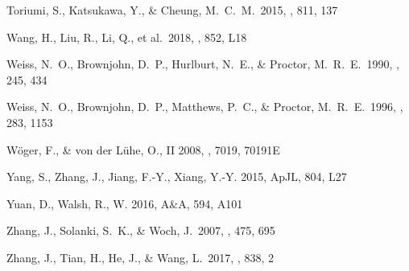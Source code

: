 \documentclass[preprint2]{aastex}
\begin{document}
\begin{thebibliography}{}
 Toriumi, S., Katsukawa, Y., \& Cheung, M.~C.~M.\ 2015, \apj, 811, 137

Wang, H., Liu, R., Li, Q., et al.\ 2018, \apjl, 852, L18

Weiss, N.~O., Brownjohn, D.~P., Hurlburt, N.~E., \& Proctor, M.~R.~E.\ 1990, \mnras, 245, 434

Weiss, N.~O., Brownjohn, D.~P., Matthews, P.~C., \& Proctor, M.~R.~E.\ 1996, \mnras, 283, 1153

W{\"o}ger, F., \& von der L{\"u}he, O., II 2008, \procspie, 7019, 70191E

Yang, S., Zhang, J., Jiang, F.-Y., Xiang, Y.-Y. 2015, ApJL, 804, L27

Yuan, D., Walsh, R., W. 2016, A\&A, 594, A101

Zhang, J., Solanki, S.~K., \& Woch, J.\ 2007, \aap, 475, 695

Zhang, J., Tian, H., He, J., \& Wang, L.\ 2017, \apj, 838, 2

\end{thebibliography}
\end{document}
